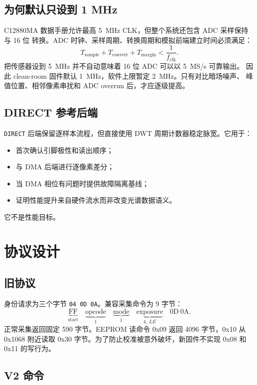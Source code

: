 \documentclass[UTF8,fontset=windows,11pt]{ctexart}
\newcommand{\code}[1]{\texttt{#1}}
\begin{document}
\subsection{为何默认只设到 1 MHz}

C12880MA 数据手册允许最高 \SI{5}{MHz} CLK，但整个系统还包含 ADC 采样保持与 16 位
转换。ADC 时钟、采样周期、转换周期和模拟前端建立时间必须满足：
\[
T_{\mathrm{sample}}+T_{\mathrm{convert}}+T_{\mathrm{margin}}
<\frac{1}{f_{\mathrm{clk}}}.
\]
把传感器设到 \SI{5}{MHz} 并不自动意味着 16 位 ADC 可以以 \SI{5}{MS/s} 可靠输出。
因此 clean-room 固件默认 \SI{1}{MHz}，软件上限暂定 \SI{2}{MHz}。只有对比暗场噪声、
峰值位置、相邻像素串扰和 ADC overrun 后，才应逐级提高。

\subsection{DIRECT 参考后端}

\code{DIRECT} 后端保留逐样本流程，但直接使用 DWT 周期计数器稳定脉宽。它用于：
\begin{itemize}
  \item 首次确认引脚极性和读出顺序；
  \item 与 DMA 后端进行逐像素差分；
  \item 当 DMA 相位有问题时提供故障隔离基线；
  \item 证明性能提升来自硬件流水而非改变光谱数据语义。
\end{itemize}
它不是性能目标。

\section{协议设计}

\subsection{旧协议}

身份请求为三个字节 \code{04 0D 0A}。兼容采集命令为 9 字节：
\[
\underbrace{\mathrm{FF}}_{\text{start}}\quad
\underbrace{\mathrm{opcode}}_{1}\quad
\underbrace{\mathrm{mode}}_{1}\quad
\underbrace{\mathrm{exposure}}_{4,\ LE}\quad
\mathrm{0D\ 0A}.
\]
正常采集返回固定 590 字节。EEPROM 读命令 0x09 返回 4096 字节，0x10 从 0x1068
附近读取 0x30 字节。为了防止校准被意外破坏，新固件不实现 0x08 和 0x11 的写行为。

\subsection{V2 命令}
\end{document}
